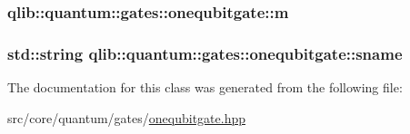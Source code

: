 \subsubsection[{\texorpdfstring{m}{m}}]{ qlib\+::quantum\+::gates\+::onequbitgate\+::m\hspace{0.3cm}{\ttfamily [private]}}\hypertarget{classqlib_1_1quantum_1_1gates_1_1onequbitgate_a6d935a1219c646b16c136560a5b4f0bf}{}\label{classqlib_1_1quantum_1_1gates_1_1onequbitgate_a6d935a1219c646b16c136560a5b4f0bf}
\subsubsection[{\texorpdfstring{sname}{sname}}]{\setlength{\rightskip}{0pt plus 5cm}std\+::string qlib\+::quantum\+::gates\+::onequbitgate\+::sname\hspace{0.3cm}{\ttfamily [private]}}\hypertarget{classqlib_1_1quantum_1_1gates_1_1onequbitgate_abc5ac874b8a4174cc72a159d3c6d91d2}{}\label{classqlib_1_1quantum_1_1gates_1_1onequbitgate_abc5ac874b8a4174cc72a159d3c6d91d2}


The documentation for this class was generated from the following file\+:\begin{DoxyCompactItemize}
\item 
src/core/quantum/gates/\hyperlink{onequbitgate_8hpp}{onequbitgate.\+hpp}\end{DoxyCompactItemize}
